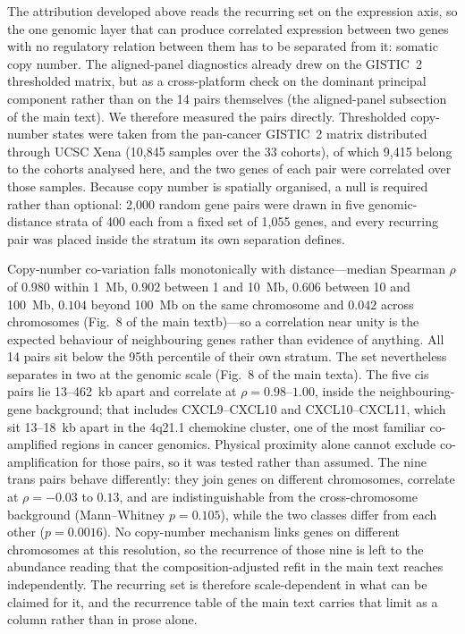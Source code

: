 \documentclass[11pt]{article}
\begin{document}
The attribution developed above reads the recurring set on the expression axis, so the one genomic layer that can produce correlated expression between two genes with no regulatory relation between them has to be separated from it: somatic copy number. The aligned-panel diagnostics already drew on the GISTIC~2 thresholded matrix, but as a cross-platform check on the dominant principal component rather than on the 14 pairs themselves (the aligned-panel subsection of the main text). We therefore measured the pairs directly. Thresholded copy-number states were taken from the pan-cancer GISTIC~2 matrix distributed through UCSC Xena \citep{goldman2020visualizing} (10{,}845 samples over the 33 cohorts), of which 9{,}415 belong to the cohorts analysed here, and the two genes of each pair were correlated over those samples. Because copy number is spatially organised, a null is required rather than optional: 2{,}000 random gene pairs were drawn in five genomic-distance strata of 400 each from a fixed set of 1{,}055 genes, and every recurring pair was placed inside the stratum its own separation defines.

Copy-number co-variation falls monotonically with distance---median Spearman $\rho$ of $0.980$ within 1~Mb, $0.902$ between 1 and 10~Mb, $0.606$ between 10 and 100~Mb, $0.104$ beyond 100~Mb on the same chromosome and $0.042$ across chromosomes (Fig.~8 of the main textb)---so a correlation near unity is the expected behaviour of neighbouring genes rather than evidence of anything. All 14 pairs sit below the 95th percentile of their own stratum. The set nevertheless separates in two at the genomic scale (Fig.~8 of the main texta). The five cis pairs lie 13--462~kb apart and correlate at $\rho = 0.98$--$1.00$, inside the neighbouring-gene background; that includes CXCL9--CXCL10 and CXCL10--CXCL11, which sit 13--18~kb apart in the 4q21.1 chemokine cluster, one of the most familiar co-amplified regions in cancer genomics. Physical proximity alone cannot exclude co-amplification for those pairs, so it was tested rather than assumed. The nine trans pairs behave differently: they join genes on different chromosomes, correlate at $\rho = -0.03$ to $0.13$, and are indistinguishable from the cross-chromosome background (Mann--Whitney $p = 0.105$), while the two classes differ from each other ($p = 0.0016$). No copy-number mechanism links genes on different chromosomes at this resolution, so the recurrence of those nine is left to the abundance reading that the composition-adjusted refit in the main text reaches independently. The recurring set is therefore scale-dependent in what can be claimed for it, and the recurrence table of the main text carries that limit as a column rather than in prose alone.
\end{document}
